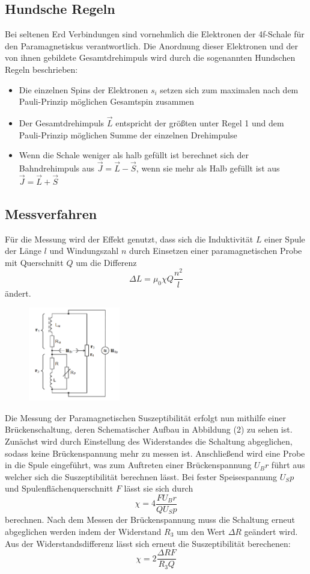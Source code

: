 \subsection{Hundsche Regeln}
Bei seltenen Erd Verbindungen sind vornehmlich die Elektronen der 4f-Schale für den Paramagnetiskus verantwortlich. Die Anordnung dieser Elektronen und der von ihnen gebildete Gesamtdrehimpuls wird durch die sogenannten Hundschen Regeln beschrieben:
\begin{itemize}
\item Die einzelnen Spins der Elektronen $s_i$ setzen sich zum maximalen nach dem Pauli-Prinzip möglichen Gesamtspin zusammen
\item Der Gesamtdrehimpuls $\vec{L}$ entspricht der größten unter Regel 1 und dem Pauli-Prinzip möglichen Summe der einzelnen Drehimpulse
\item Wenn die Schale weniger als halb gefüllt ist berechnet sich der Bahndrehimpuls aus $\vec{J}=\vec{L}-\vec{S}$, wenn sie mehr als Halb gefüllt ist aus $\vec{J}=\vec{L}+\vec{S}$
\end{itemize}
\subsection{Messverfahren}
Für die Messung wird der Effekt genutzt, dass sich die Induktivität $L$ einer Spule der Länge $l$ und Windungszahl $n$ durch Einsetzen einer paramagnetischen Probe mit Querschnitt $Q$ um die Differenz
\begin{equation*}
\Delta L=\mu_0 \chi Q \frac{n^2}{l}
\end{equation*}
ändert. 
\begin{figure}[h]
    \centering
    \includegraphics[width=4cm, keepaspectratio]{Brückenschaltung}
    \label{Brückenschaltung}
  \end{figure}
Die Messung der Paramagnetischen Suszeptibilität erfolgt nun mithilfe einer Brückenschaltung, deren Schematischer Aufbau in Abbildung (2) zu sehen ist. Zunächst wird durch Einstellung des Widerstandes die Schaltung  abgeglichen, sodass keine Brückenspannung mehr zu messen ist. Anschließend wird eine Probe in die Spule eingeführt, was zum Auftreten einer Brückenspannung $U_Br$ führt aus welcher sich die Suszeptibilität berechnen lässt. Bei fester Speisespannung $U_Sp$ und Spulenflächenquerschnitt $F$ lässt sie sich durch
\begin{equation}
\chi=4\frac{FU_Br}{QU_Sp}
\end{equation}
berechnen. Nach dem Messen der Brückenspannung muss die Schaltung erneut abgeglichen werden indem der Widerstand $R_3$ um den Wert $\Delta R$ geändert wird. Aus der Widerstandsdifferenz lässt sich erneut die Suszeptibilität berechenen:
\begin{equation}
\chi=2\frac{\Delta R F}{R_3 Q}
\end{equation}
